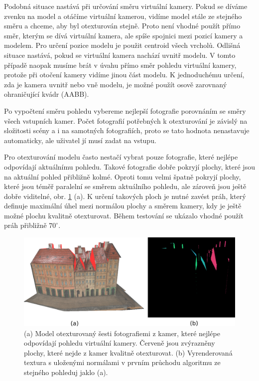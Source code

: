 \documentclass[11pt,twoside,a4paper]{book}
\begin{document}
Podobná situace nastává při určování směru virtuální kamery.  Pokud se díváme zvenku na model a otáčíme virtuální kamerou, vidíme model stále ze stejného směru a chceme, aby byl otexturován stejně. Proto není vhodné použít přímo směr, kterým se dívá virtuální kamera, ale spíše spojnici mezi pozicí kamery a modelem. Pro určení pozice modelu je použit centroid všech vrcholů. Odlišná situace nastává, pokud se virtuální kamera nachází uvnitř modelu. V tomto případě naopak musíme brát v úvahu přímo směr pohledu virtuální kamery, protože při otočení kamery vidíme jinou část modelu. K jednoduchému určení, zda je kamera uvnitř nebo vně modelu, je možné použít osově zarovnaný ohraničující kvádr (AABB).


Po vypočtení směru pohledu vybereme nejlepší fotografie porovnáním se směry všech vstupních kamer. Počet fotografií potřebných k otexturování je závislý na složitosti scény a i na samotných fotografiích, proto se tato hodnota nenastavuje automaticky, ale uživatel jí musí zadat na vstupu.

Pro otexturování modelu často nestačí vybrat pouze fotografie, které nejlépe odpovídají aktuálnímu pohledu. Takové fotografie dobře pokryjí plochy, které jsou na aktuální pohled přibližně kolmé. Oproti tomu velmi špatně pokryjí plochy, které jsou téměř paralelní se směrem aktuálního pohledu, ale zároveň jsou ještě dobře viditelné, obr. \ref{fig:faces-no-tex} (a). K určení takových ploch je nutné zavést práh, který definuje maximální úhel mezi normálou plochy a směrem kamery, kdy je ještě možné plochu kvalitně otexturovat. Během testování se ukázalo vhodné použít práh přibližně $70^{\circ}$. 


\begin{figure}[h]
\begin{center}
\includegraphics[width=\textwidth]{figures/faces-no-tex}
\caption{(a) Model otexturovaný šesti fotografiemi z kamer, které nejlépe odpovídají pohledu virtuální kamery. Červeně jsou zvýrazněny plochy, které nejde z kamer kvalitně otexturovat. (b) Vyrenderovaná textura s uloženými normálami v prvním průchodu algoritmu ze stejného pohleduj jaklo (a).}
\label{fig:faces-no-tex}
\end{center}
\end{figure}
\end{document}
